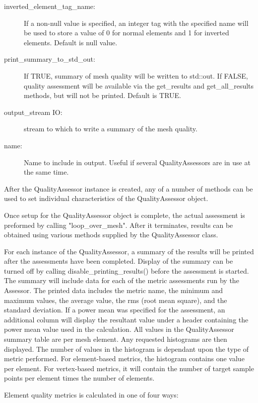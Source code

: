 \begin{description}
\item[inverted\_element\_tag\_name:] If a non-null value is specified, an integer tag with the specified name will be used to store a value of 0 for normal elements and 1 for inverted elements.  Default is null value.

\item[print\_summary\_to\_std\_out:] If TRUE, summary of mesh quality will be written to std::out.  If FALSE, quality assessment will be available via the get\_results and get\_all\_results methods, but will not be printed.	 Default is TRUE.

\item[output\_stream IO:] stream to which to write a summary of the mesh quality.

\item[name:] Name to include in output.	 Useful if several QualityAssessors are in use at the same time.
\end{description}

  After the QualityAssessor instance is created, any of a number of methods can be used to set individual characteristics of the QualityAssessor object.

  Once setup for the QualityAssessor object is complete, the actual assessment is preformed by calling "loop\_over\_mesh".  After it terminates, results can be obtained using various methods supplied by the QualityAssessor class.

For each instance of the QualityAssessor, a summary of the results will be printed after the assessments have been completed. Display of the summary can be turned off by calling disable\_printing\_results() before the assessment is started.  The summary will include data for each of the metric assessments run by the Assessor.	 The printed data includes the metric name, the minimum and maximum values, the average value, the rms (root mean square), and the standard deviation.	If a power mean was specified for the assessment, an additional column will display the resultant value under a header containing the power mean value used in the calculation.	  All values in the QualityAssessor summary table are per mesh element.	 Any requested histograms are then displayed.  The number of values in the histogram is dependant upon the type of metric performed.  For element-based metrics, the histogram contains one value per element.	For vertex-based metrics, it will contain the number of target sample points per element times the number of elements.

Element quality metrics is calculated in one of  four ways:


